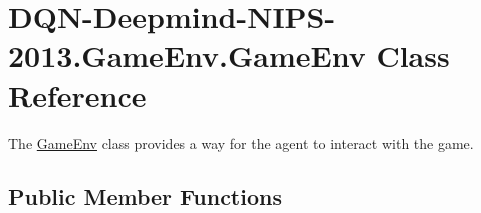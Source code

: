 \hypertarget{classDQN-Deepmind-NIPS-2013_1_1GameEnv_1_1GameEnv}{}\section{D\+Q\+N-\/\+Deepmind-\/\+N\+I\+P\+S-\/2013.Game\+Env.\+Game\+Env Class Reference}
\label{classDQN-Deepmind-NIPS-2013_1_1GameEnv_1_1GameEnv}


The \hyperlink{classDQN-Deepmind-NIPS-2013_1_1GameEnv_1_1GameEnv}{Game\+Env} class provides a way for the agent to interact with the game.  


\subsection*{Public Member Functions}
